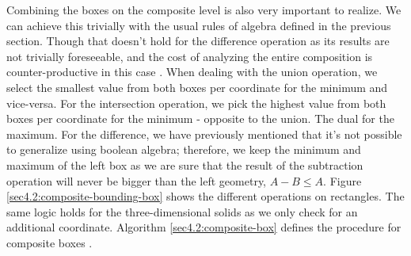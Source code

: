 \documentclass[a4paper,11pt,oneside]{article}
\begin{document}
Combining the boxes on the composite level is also very important to realize. We can achieve this trivially with the usual rules of algebra defined in the previous section. Though that doesn't hold for the difference operation as its results are not trivially foreseeable, and the cost of analyzing the entire composition is counter-productive in this case \cite{ROTH1982109}. When dealing with the union operation, we select the smallest value from both boxes per coordinate for the minimum and vice-versa. For the intersection operation, we pick the highest value from both boxes per coordinate for the minimum - opposite to the union.
The dual for the maximum.  For the difference, we have previously mentioned that it's not possible to generalize using boolean algebra; therefore, we keep the minimum and maximum of the left box as we are sure that the result of the subtraction operation will never be bigger than the left geometry, $A - B \leq A$. Figure \ref{sec4.2:composite-bounding-box} shows the different operations on rectangles. The same logic holds for the three-dimensional solids as we only check for an additional coordinate. Algorithm \ref{sec4.2:composite-box} defines the procedure for composite boxes \cite{ROTH1982109}.
\end{document}
